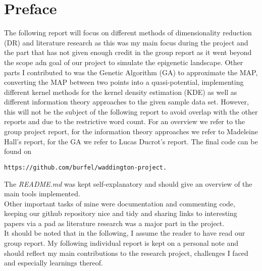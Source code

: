 \documentclass[journal, a4paper]{IEEEtran}
\begin{document}
\section{Preface}
The following report will focus on different methods of dimensionality reduction (DR) and literature research as this was my main focus during the project and the part that has not given enough credit in the group report as it went beyond the scope adn goal of our project to simulate the epigenetic landscape.
Other parts I contributed to was the Genetic Algorithm (GA) to approximate the MAP, converting the MAP between two points into a quasi-potential, implementing different kernel methods for the kernel density estimation (KDE) as well as different information theory approaches to the given sample data set. However, this will not be the subject of the following report to avoid overlap with the other reports and due to the restrictive word count. For an overview we refer to the group project report, for the information theory approaches we refer to Madeleine Hall's report, for the GA we refer to Lucas Ducrot's report. The final code can be found on \begin{verbatim}
https://github.com/burfel/waddington-project.
\end{verbatim}	
The \textit{README.md} was kept self-explanatory and should give an overview of the main tools implemented. \\
Other important tasks of mine were documentation and commenting code, keeping our github repository nice and tidy and sharing links to interesting papers via a pad as literature research was a major part in the project. \\

It should be noted that in the following, I assume the reader to have read our group report. My following individual report is kept on a personal note and should reflect my main contributions to the research project, challenges I faced and especially learnings thereof. 


	

\end{document}
